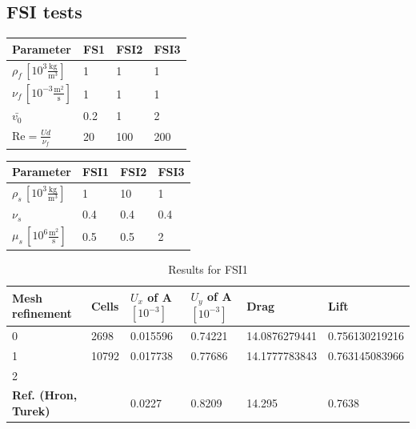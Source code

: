 \subsection{FSI tests}

\begin{table}[!ht]
\begin{center}
  \begin{tabular}{|l | l | l | l|} \hline
	Parameter & FS1 & FSI2 & FSI3 \\ \hline
    $\rho_f\, [10^3\frac{\text{kg}}{\text{m}^3}]$  & 1 & 1 & 1 \\   \hline
    $\nu_f\, [10^{-3}\frac{\text{m}^2}{\text{s}}]$ & 1 & 1 & 1 \\ \hline
    $\bar{v_0}$ & 0.2 & 1 & 2   \\ \hline \hline
    $\text{Re} = \frac{Ud}{\nu_f}$ & 20 & 100 & 200 \\ \hline
    \hline
  \end{tabular}
\end{center}
\end{table}

\begin{table}[!ht]
\begin{center}
  \begin{tabular}{|l | l | l | l|} \hline
	Parameter & FSI1 & FSI2 & FSI3 \\ \hline
    $\rho_s \,[10^3\frac{\text{kg}}{\text{m}^3}]$  & 1 & 10 & 1 \\   \hline
    $\nu_s $ & 0.4 & 0.4 & 0.4 \\ \hline
    $\mu_s \,[10^{6}\frac{\text{m}^2}{\text{s}}]$ & 0.5 & 0.5 & 2   \\ \hline \hline
  \end{tabular}
\end{center}
\end{table}
\begin{table}[!ht]
\begin{center}
  \begin{tabular}{|l | l | l | l | l | l|} \hline
	Mesh refinement & Cells & $U_x$ of A $[10^{-3}]$ & $U_y$ of A $[10^{-3}]$ & Drag & Lift\\ \hline
    0  & 2698 & 0.015596 & 0.74221 & 14.0876279441 & 0.756130219216 \\   \hline
    1 & 10792 & 0.017738 & 0.77686 & 14.1777783843 & 0.763145083966 \\ \hline
    2 &  & $ $&  $ $ & $ $ & $ $   \\ \hline \hline
    \textbf{Ref. (Hron, Turek)}  & & 0.0227 & 0.8209 & 14.295 & 0.7638\\ \hline 
    \hline
  \end{tabular}	
\caption{Results for FSI1}
\end{center}
\end{table}

